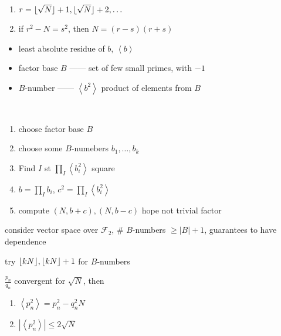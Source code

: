 \begin{example}
    \begin{enumerate}
        \item $r = \lfloor\sqrt{N}\rfloor + 1, \lfloor\sqrt{N}\rfloor + 2, \dots$
        \item if $r^2 - N = s^2$, then $N = (r-s)(r+s)$
    \end{enumerate}
\end{example}

\begin{itemize}
    \item least absolute residue of $b$, $\left< b \right>$
    \item factor base $B$ ------ set of few small primes, with $-1$
    \item $B$-number ------ $\left< b^2 \right>$ product of elements from $B$
\end{itemize}

\begin{example}\,
    \begin{enumerate}
        \item choose factor base $B$
        \item choose some $B$-numebers $b_1, \dots, b_k$
        \item Find $I$ st $\prod_I \left< b^2_i \right>$ square
        \item $b = \prod_I b_i$, $c^2 = \prod_I \left< b^2_i \right>$
        \item compute $(N, b+c), (N, b-c)$ hope not trivial factor
    \end{enumerate}
\end{example}

\begin{fact}
    consider vector space over $\mathcal{F}_2$, $\#$ $B$-numbers $\geq |B| + 1$, guarantees to have dependence
\end{fact}

\begin{fact}
    try $\lfloor kN\rfloor, \lfloor kN\rfloor + 1$ for $B$-numbers
\end{fact}

\begin{lemma}
    $\frac{p_n}{q_n}$ convergent for $\sqrt{N}$, then
    \begin{enumerate}
        \item $\left< p_n^2 \right> = p_n^2 - q_n^2 N$
        \item $| \left< p_n^2 \right> | \leq 2 \sqrt{N}$
    \end{enumerate}
\end{lemma}

